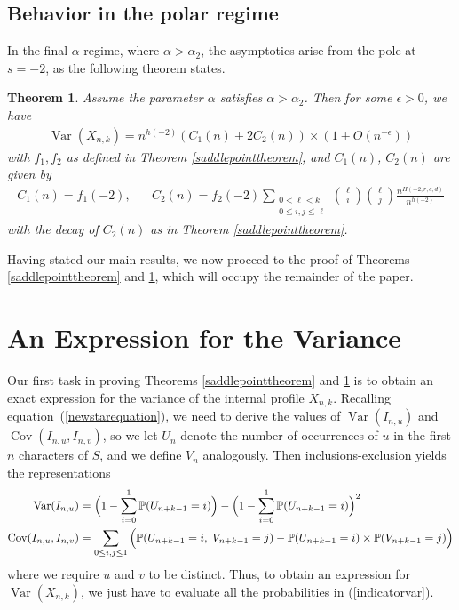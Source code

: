 \documentclass[proceedings]{aofa}
\newtheorem{theorem}{Theorem}
\def\Var{\mathop{\operatorname{Var}}}
\def\Cov{\mathop{\operatorname{Cov}}}
\newcommand{\Iu}{I_{n,u}}
\newcommand{\Iv}{I_{n,v}}
\newcommand{\pro}{\mathbb{P}}
\def\Cov{\mathop{\operatorname{Cov}}}
\begin{document}
\subsection{Behavior in the polar regime}
In the final $\alpha$-regime, where $\alpha> \alpha_{2}$, the
asymptotics arise from the pole at $s=-2$, as the following theorem states.
\begin{theorem}\label{poletheorem}
Assume the parameter $\alpha$ satisfies $\alpha>\alpha_{2}$. Then for some $\epsilon>0$, we have
\begin{align*}
\Var(X_{n,k})=n^{h(-2)}(C_{1}(n)+2C_{2}(n)) \times (1+O(n^{-\epsilon}))
\end{align*}
with $f_{1},f_{2}$ as defined in Theorem
\ref{saddlepointtheorem}, and $C_{1}(n)$, $C_{2}(n)$ are given by
\begin{align*}
C_{1}(n)=f_{1}(-2),\hspace{20pt} C_{2}(n)=f_{2}(-2)\sum_{\substack{ 0 < \ell < k \\ 0 \leq i,j \leq \ell}}{\ell \choose i}{\ell \choose j}\frac{n^{H(-2,r,c,d)}}{n^{h(-2)}}
\end{align*}
with the decay of $C_{2}(n)$ as in Theorem \ref{saddlepointtheorem}.
\end{theorem}

Having stated our main results, we now proceed to the proof of Theorems \ref{saddlepointtheorem} and \ref{poletheorem}, which will occupy the remainder of the paper.

\section{An Expression for the Variance}\label{sec:combo} 
Our first task in proving  Theorems \ref{saddlepointtheorem} and
\ref{poletheorem} is  to obtain an exact expression for the variance
of the internal profile $X_{n,k}$.
Recalling equation~(\ref{newstarequation}),
we need to derive the values of $\Var(\Iu)$ and $\Cov(\Iu,\Iv)$, so we let
$U_{n}$ denote the number of occurrences of $u$ in the first $n$
characters of $S$,
and we define $V_{n}$ analogously. Then inclusions-exclusion yields the representations
\begin{align}\label{indicatorvar}
\Var(\Iu)&=\Big(1-\sum_{i=0}^{1}\pro(U_{n+k-1}=i)\Big)-\Big(1-\sum_{i=0}^{1}\pro(U_{n+k-1}=i)\Big)^{2}\notag\\
\Cov(\Iu,\Iv)&=\sum_{0 \leq i,j \leq 1}\Big(\pro(U_{n+k-1}=i,\;V_{n+k-1}=j)-\pro(U_{n+k-1}=i) \times \pro(V_{n+k-1}=j)\Big)
\end{align}
where we require $u$ and $v$ to be distinct. Thus, to obtain an expression for $\Var(X_{n,k})$, we just have to evaluate all the probabilities in (\ref{indicatorvar}).
\end{document}
